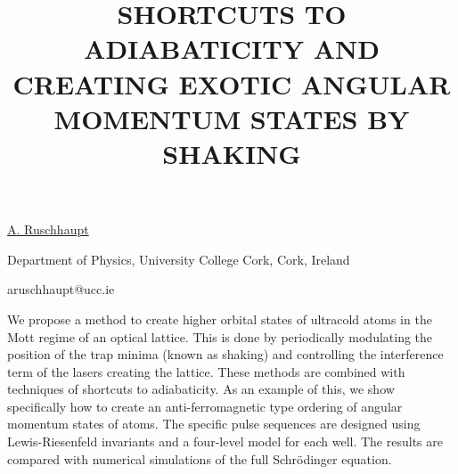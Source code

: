 \title{SHORTCUTS TO ADIABATICITY AND CREATING EXOTIC ANGULAR MOMENTUM STATES BY SHAKING}

\underline{A. Ruschhaupt} 

{\normalsize{\vspace{-4mm}
Department of Physics,
University College Cork,
Cork,
Ireland

\email aruschhaupt@ucc.ie}}

We propose a method to create higher orbital states of ultracold atoms in the Mott regime of an optical lattice. This is done by periodically modulating the position of the trap minima (known as shaking) and controlling the interference term of the lasers creating the lattice. These methods are combined with techniques of shortcuts to adiabaticity. As an example of this, we show specifically how to create an anti-ferromagnetic type ordering of angular momentum states of atoms. The specific pulse sequences are designed using Lewis-Riesenfeld invariants and a four-level model for each well. The results are compared with numerical simulations of the full Schr\"{o}dinger equation.

%
%



\vspace{\baselineskip} 